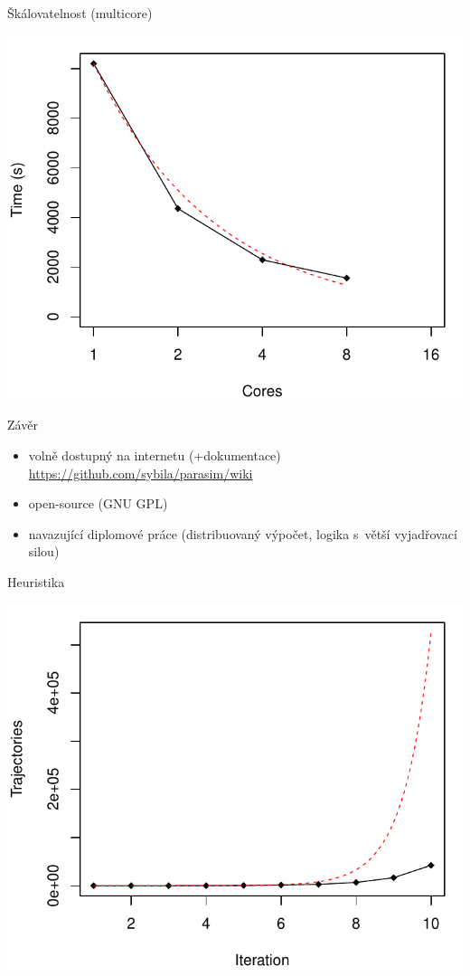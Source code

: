 \documentclass[xcolor=svgnames,14pt]{beamer}
\begin{document}
\begin{frame}{Škálovatelnost (multicore)}
	\begin{center}\includegraphics[height=0.8\textheight]{lotkav-iterations-shared-time.pdf}\end{center}
\end{frame}

\begin{frame}{Závěr}
	\begin{itemize}
		\item volně dostupný na internetu (+dokumentace)\\\mbox{\url{https://github.com/sybila/parasim/wiki}}
		\item open-source (GNU GPL)
		\item navazující diplomové práce
			(distribuovaný výpočet, logika s~větší vyjadřovací silou)
	\end{itemize}
\end{frame}

\frame[plain]{}

\begin{frame}{Heuristika}
	\begin{center}\includegraphics[height=0.9\textheight]{lotkav-iterations-shared-iterations-primary-summary.pdf}\end{center}
\end{frame}
\end{document}
